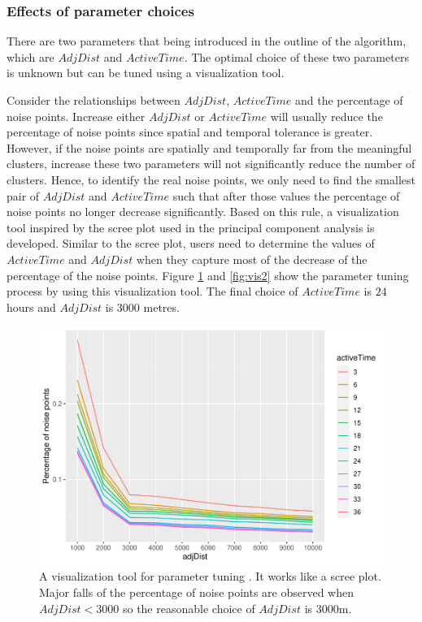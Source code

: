 \hypertarget{effects-of-parameter-choices}{%
\subsubsection{Effects of parameter
choices}\label{effects-of-parameter-choices}}

There are two parameters that being introduced in the outline of the
algorithm, which are \(AdjDist\) and \(ActiveTime\). The optimal choice
of these two parameters is unknown but can be tuned using a
visualization tool.

Consider the relationships between \(AdjDist\), \(ActiveTime\) and the
percentage of noise points. Increase either \(AdjDist\) or
\(ActiveTime\) will usually reduce the percentage of noise points since
spatial and temporal tolerance is greater. However, if the noise points
are spatially and temporally far from the meaningful clusters, increase
these two parameters will not significantly reduce the number of
clusters. Hence, to identify the real noise points, we only need to find
the smallest pair of \(AdjDist\) and \(ActiveTime\) such that after
those values the percentage of noise points no longer decrease
significantly. Based on this rule, a visualization tool inspired by the
scree plot used in the principal component analysis is developed.
Similar to the scree plot, users need to determine the values of
\(ActiveTime\) and \(AdjDist\) when they capture most of the decrease of
the percentage of the noise points. Figure \ref{fig:vis1} and
\ref{fig:vis2} show the parameter tuning process by using this
visualization tool. The final choice of \(ActiveTime\) is \(24\) hours
and \(AdjDist\) is \(3000\) metres.

\begin{Schunk}
\begin{figure}

{\centering \includegraphics[width=0.8\linewidth]{clustering_paper_files/figure-latex/vis1-1} 

}

\caption[A visualization tool for parameter tuning ]{A visualization tool for parameter tuning . It works like a scree plot. Major falls of the percentage of noise points are observed when $AdjDist < 3000$ so the reasonable choice of $AdjDist$ is 3000m.}\label{fig:vis1}
\end{figure}
\end{Schunk}

